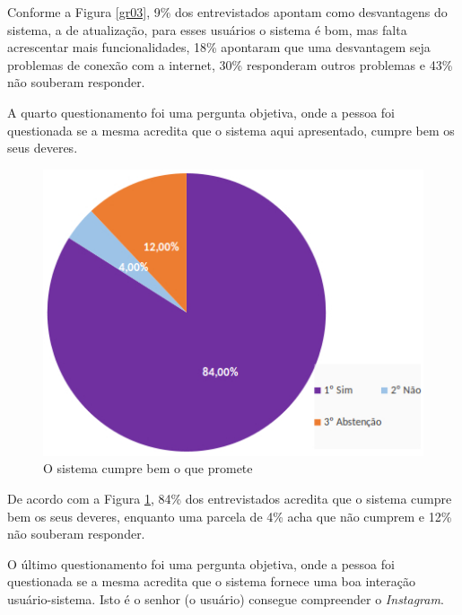 \documentclass[
	12pt,				%
	openright,			%
	oneside,			%
	a4paper,			%
	english,			%
	french,				%
	spanish,			%
	brazil,				%
	]{abntex2}
\begin{document}
Conforme a Figura \ref{gr03}, 9\% dos entrevistados apontam como desvantagens do sistema, a  de atualização, para esses usuários o sistema é bom, mas falta acrescentar mais funcionalidades, 18\% apontaram que uma desvantagem seja problemas de conexão com a internet, 30\% responderam outros problemas e 43\% não souberam responder.

A quarto questionamento foi uma pergunta objetiva, onde a pessoa foi questionada se a mesma acredita que o sistema aqui apresentado, cumpre bem os seus deveres.

\begin{figure}[h]
	\caption{\label{gr04}O sistema cumpre bem o que promete}
	\begin{center}
		\includegraphics[scale=0.5]{graficos/04.jpg}
	\end{center}
\end{figure}

De acordo com a Figura \ref{gr04}, 84\% dos entrevistados acredita que o sistema cumpre bem os seus deveres, enquanto uma parcela de 4\% acha que não cumprem e 12\% não souberam responder.

O último questionamento foi uma pergunta objetiva, onde a pessoa foi questionada se a mesma acredita que o sistema fornece uma boa interação usuário-sistema. Isto é o senhor (o usuário) consegue compreender o \textit{Instagram}.
\end{document}
